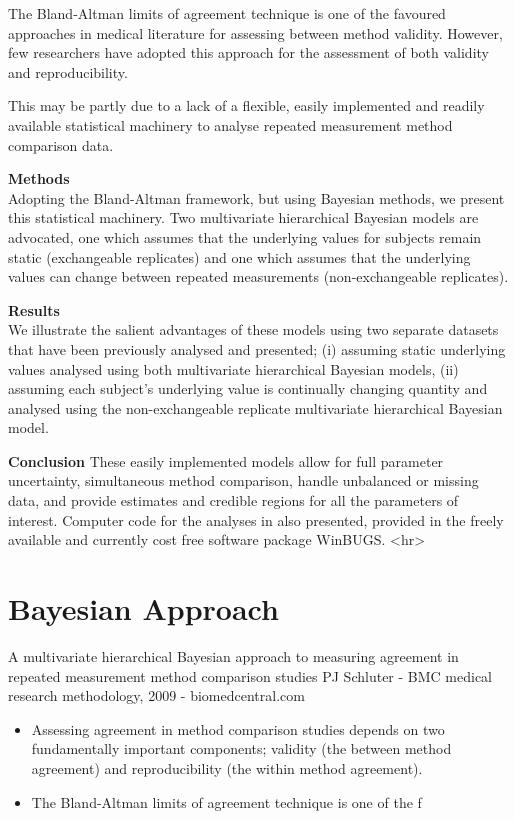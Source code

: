 \documentclass[12pt, a4paper]{report}
\begin{document}
The Bland-Altman limits of agreement technique is one of the favoured approaches in medical literature for assessing between method validity. However, few researchers have adopted this approach for the assessment of both validity and reproducibility. 

This may be partly due to a lack of a flexible, easily implemented and readily available statistical machinery to analyse repeated measurement method comparison data.

\textbf{Methods}\\
Adopting the Bland-Altman framework, but using Bayesian methods, we present this statistical machinery. Two multivariate hierarchical Bayesian models are advocated, one which assumes that the underlying values for subjects remain static (exchangeable replicates) and one which assumes that the underlying values can change between repeated measurements (non-exchangeable replicates).

\textbf{Results}\\
We illustrate the salient advantages of these models using two separate datasets that have been previously analysed and presented; 
(i) assuming static underlying values analysed using both multivariate hierarchical Bayesian models,  
(ii) assuming each subject's underlying value is continually changing quantity and analysed using the non-exchangeable replicate multivariate hierarchical Bayesian model.  

\textbf{Conclusion}
These easily implemented models allow for full parameter uncertainty, simultaneous method comparison, handle unbalanced or missing data, and provide estimates and credible regions for all the parameters of interest. Computer code for the analyses in also presented, provided in the freely available and currently cost free software package WinBUGS.
<hr>

\section*{Bayesian Approach}
A multivariate hierarchical Bayesian approach to measuring agreement in repeated measurement method comparison studies
PJ Schluter - BMC medical research methodology, 2009 - biomedcentral.com

\begin{itemize}
	\item Assessing agreement in method comparison studies depends on two fundamentally important 
	components; validity (the between method agreement) and reproducibility (the within method 
	agreement). 
	\item The Bland-Altman limits of agreement technique is one of the f
\end{itemize}
\end{document}
